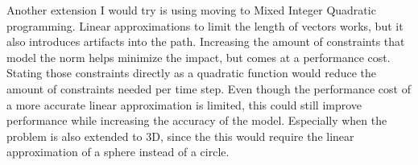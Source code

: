 Another extension I would try is using moving to Mixed Integer Quadratic programming. Linear approximations to limit the length of vectors works, but it also introduces artifacts into the path. Increasing the amount of constraints that model the norm helps minimize the impact, but comes at a performance cost. Stating those constraints directly as a quadratic function would reduce the amount of constraints needed per time step. Even though the performance cost of a more accurate linear approximation is limited, this could still improve performance while increasing the accuracy of the model. Especially when the problem is also extended to 3D, since the this would require the linear approximation of a sphere instead of a circle. \\